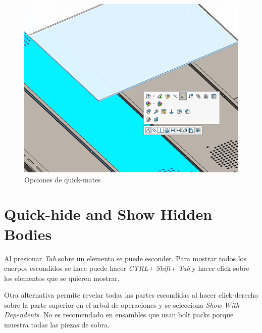 \documentclass{report}
\begin{document}
\begin{figure}[H]
	\centering
	\includegraphics[width=0.85\linewidth, height=0.75\textheight,keepaspectratio]{Imagenes/solidworks_quickmates_01}
	\caption{Opciones de quick-mates}
	\label{fig:solidworksquickmates01}
\end{figure}

\chapter{Quick-hide and Show Hidden Bodies}

Al presionar \emph{Tab} sobre un elemento se puede esconder. Para mostrar todos los cuerpos escondidos se hace puede hacer \emph{CTRL+ Shift+ Tab} y hacer click sobre los elementos que se quieren mostrar.

Otra alternativa permite revelar todas las partes escondidas al hacer click-derecho sobre la parte superior en el arbol de operaciones y se selecciona \emph{Show With Dependents}. No es recomendado en ensambles que usan bolt packs porque muestra todas las piezas de sobra.
\end{document}
